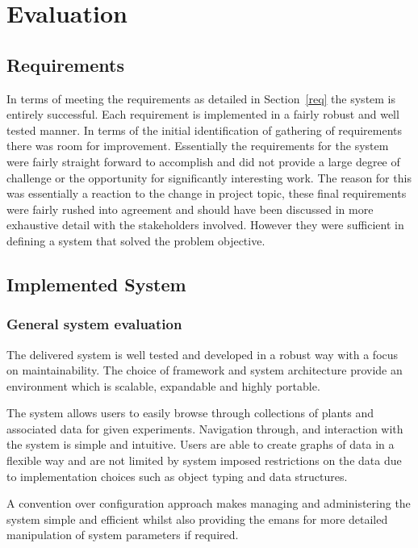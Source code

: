 \chapter{Evaluation}

\section{Requirements}

In terms of meeting the requirements as detailed in Section~\ref{req} the system is entirely successful. Each requirement is implemented in a fairly robust and well tested manner. In terms of the initial identification of gathering of requirements there was room for improvement. Essentially the requirements for the system were fairly straight forward to accomplish and did not provide a large degree of challenge or the opportunity for significantly interesting work. The reason for this was essentially a reaction to the change in project topic, these final requirements were fairly rushed into agreement and should have been discussed in more exhaustive detail with the stakeholders involved. However they were sufficient in defining a system that solved the problem objective.




\section{Implemented System}
\subsection{General system evaluation}
The delivered system is well tested and developed in a robust way with a focus on maintainability. The choice of framework and system architecture provide an environment which is scalable, expandable and highly portable.

The system allows users to easily browse through collections of plants and associated data for given experiments. Navigation through, and interaction with the system is simple and intuitive. Users are able to create graphs of data in a flexible way and are not limited by system imposed restrictions on the data due to implementation choices such as object typing and data structures.

A convention over configuration approach makes managing and administering the system simple and efficient whilst also providing the emans for more detailed manipulation of system parameters if required. 

